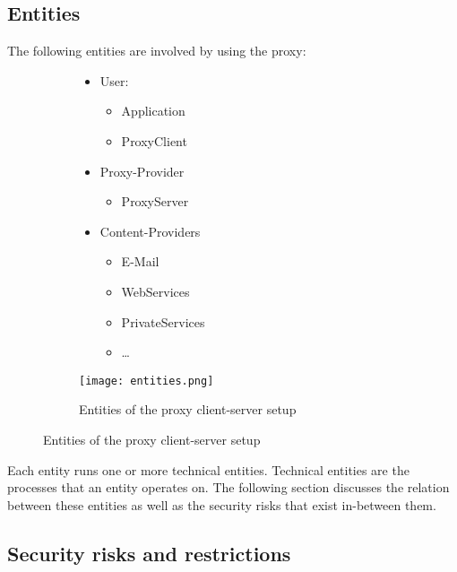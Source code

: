 \documentclass[12pt, a4paper]{scrartcl}
\begin{document}
\subsection{Entities}
The following entities are involved by using the proxy:
\begin{figure}[H]
    \centering
    \begin{subfigure}{0.45\textwidth}
        \begin{itemize}
            \item User:
            \begin{itemize}
                \item Application
                \item ProxyClient
            \end{itemize}
            \item Proxy-Provider
            \begin{itemize}
                \item ProxyServer
            \end{itemize}
            \item Content-Providers
            \begin{itemize}
                \item E-Mail
                \item WebServices
                \item PrivateServices
                \item \ldots
            \end{itemize}
        \end{itemize}
    \end{subfigure}
    \begin{subfigure}{0.5\textwidth}
        \centering
        \texttt{[image: entities.png]}
        \caption{Entities of the proxy client-server setup}
        \label{fig::enti}
    \end{subfigure}
\end{figure}

\noindent Each entity runs one or more technical entities. Technical entities are the processes that an entity operates on.\newline
The following section discusses the relation between these entities as well as the security risks that exist in-between them.

\subsection{Security risks and restrictions}
\end{document}
